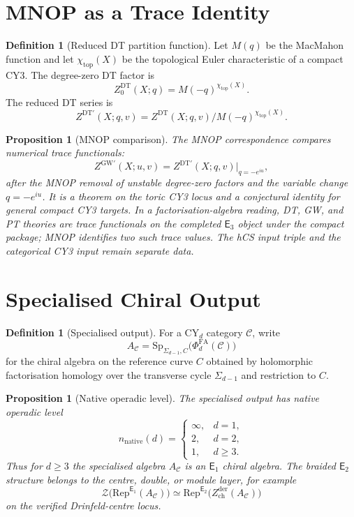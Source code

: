 \documentclass[11pt]{amsart}
\newtheorem{proposition}[theorem]{Proposition}
\theoremstyle{definition}
\newtheorem{definition}[theorem]{Definition}
\theoremstyle{remark}
\providecommand{\cC}{\mathcal{C}}
\providecommand{\Eone}{\mathsf{E}_1}
\providecommand{\Etwo}{\mathsf{E}_2}
\providecommand{\Ethree}{\mathsf{E}_3}
\providecommand{\Rep}{\mathrm{Rep}}
\providecommand{\Sp}{\mathrm{Sp}}
\providecommand{\Zchder}{Z^{\mathrm{der}}_{\mathrm{ch}}}
\providecommand{\PhiFA}{\Phi^{\mathrm{FA}}}
\begin{document}
\section{MNOP as a Trace Identity}

\begin{definition}[Reduced DT partition function]
\label{def:reduced-dt}
Let $M(q)$ be the MacMahon function and let $\chi_{\mathrm{top}}(X)$ be
the topological Euler characteristic of a compact CY3.  The degree-zero
DT factor is
\[
  Z^{\mathrm{DT}}_0(X;q)=M(-q)^{\chi_{\mathrm{top}}(X)}.
\]
The reduced DT series is
\[
  Z^{\mathrm{DT}\prime}(X;q,v)
  =
  Z^{\mathrm{DT}}(X;q,v)/M(-q)^{\chi_{\mathrm{top}}(X)}.
\]
\end{definition}

\begin{proposition}[MNOP comparison]
\label{prop:mnop}
The MNOP correspondence compares numerical trace functionals:
\[
  Z^{\mathrm{GW}\prime}(X;u,v)
  =
  Z^{\mathrm{DT}\prime}(X;q,v)\big|_{q=-e^{iu}},
\]
after the MNOP removal of unstable degree-zero factors and the variable
change $q=-e^{iu}$.  It is a theorem on the toric CY3 locus and a
conjectural identity for general compact CY3 targets.  In a
factorisation-algebra reading, DT, GW, and PT theories are trace
functionals on the completed $\Ethree$ object under the compact package;
MNOP identifies two such trace values.  The hCS input triple and the
categorical CY3 input remain separate data.
\end{proposition}

\section{Specialised Chiral Output}

\begin{definition}[Specialised output]
\label{def:specialised-output}
For a CY$_d$ category $\cC$, write
\[
  A_\cC
  =
  \Sp_{\Sigma_{d-1},C}\bigl(\PhiFA_d(\cC)\bigr)
\]
for the chiral algebra on the reference curve $C$ obtained by
holomorphic factorisation homology over the transverse cycle
$\Sigma_{d-1}$ and restriction to $C$.
\end{definition}

\begin{proposition}[Native operadic level]
\label{prop:native-level}
The specialised output has native operadic level
\[
  n_{\mathrm{native}}(d)=
  \begin{cases}
  \infty, & d=1,\\
  2, & d=2,\\
  1, & d\geq 3.
  \end{cases}
\]
Thus for $d\geq 3$ the specialised algebra $A_\cC$ is an $\Eone$ chiral
algebra.  The braided $\Etwo$ structure belongs to the centre, double, or
module layer, for example
\[
  \mathcal Z\bigl(\Rep^{\Eone}(A_\cC)\bigr)
  \simeq
  \Rep^{\Etwo}\bigl(\Zchder(A_\cC)\bigr)
\]
on the verified Drinfeld-centre locus.
\end{proposition}
\end{document}
